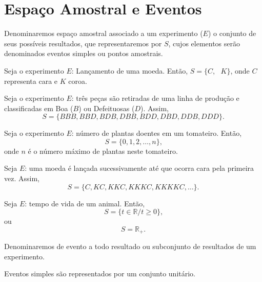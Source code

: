 \documentclass[11pt,fleqn]{book}
\numberwithin{mpicture}{chapter}
\numberwithin{mtable}{chapter}
\numberwithin{mframe}{chapter}
\begin{document}
\section{Espaço Amostral e Eventos}

\begin{definition}
	Denominaremos espaço amostral associado a um experimento ($E$) o conjunto de seus possíveis resultados, que representaremos por $S$, cujos elementos serão denominados eventos simples ou pontos amostrais.
\end{definition}

\begin{example}
	Seja o experimento $E$: Lançamento de uma moeda. Então, $S=\{C,\text{ }K\}$, onde $C$ representa cara e $K$ coroa.
\end{example}

\begin{example}
	\label{example:pecas_boas_defeituosas}
	Seja o experimento $E$: três peças são retiradas de uma linha de produção e classificadas em Boa ($B$) ou Defeituosas ($D$). Assim,
	\[
		S=\{BBB, BBD, BDB, DBB, BDD, DBD, DDB, DDD\}\text{.}
	\]
\end{example}

\begin{example}
	Seja o experimento $E$: número de plantas doentes em um tomateiro. Então,
	\[
		S=\{0, 1, 2, \dots, n\}\text{,}
	\]
	onde $n$ é o número máximo de plantas neste tomateiro.
\end{example}

\begin{example}
	Seja $E$: uma moeda é lançada sucessivamente até que ocorra cara pela primeira vez. Assim,
	\[
		S=\{C, KC, KKC, KKKC, KKKKC, \dots \}\text{.}
	\]
\end{example}

\begin{example}
	Seja $E$: tempo de vida de um animal. Então,
	\[
		S=\{t\in\mathbb{R}/ t\geqslant 0\}\text{,}
	\]
	ou
	\[
		S=\mathbb{R}_{+}\text{.}
	\]
\end{example}

\begin{definition}
	Denominaremos de evento a todo resultado ou subconjunto de resultados de um experimento.
\end{definition}

\begin{remark}
	Eventos simples são representados por um conjunto unitário.
\end{remark}
\end{document}
